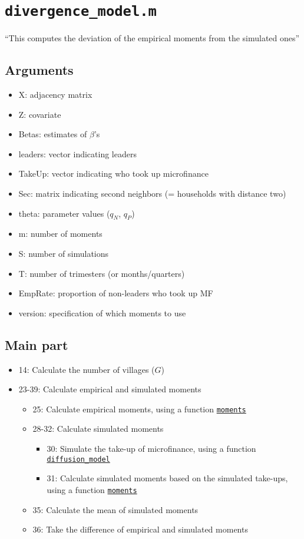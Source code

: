 \documentclass[10pt,letterpaper]{article}
\begin{document}
\section{\texttt{divergence\_model.m}}\label{divergence_model}

``This computes the deviation of the empirical moments from the simulated ones''

\subsection*{Arguments}
\begin{itemize}
  \item X: adjacency matrix
  \item Z: covariate
  \item Betas: estimates of $\beta$'s 
  \item leaders: vector indicating leaders
  \item TakeUp: vector indicating who took up microfinance
  \item Sec: matrix indicating second neighbors (= households with distance two)
  \item theta: parameter values ($q_N$, $q_P$)
  \item m: number of moments
  \item S: number of simulations
  \item T: number of trimesters (or months/quarters)
  \item EmpRate: proportion of non-leaders who took up MF
  \item version: specification of which moments to use
\end{itemize}

\subsection*{Main part}
\begin{itemize}
  \item 14: Calculate the number of villages ($G$)
  \item 23-39: Calculate empirical and simulated moments
    \begin{itemize}
      \item 25: Calculate empirical moments, using a function \hyperref[moments]{\texttt{moments}}
      \item 28-32: Calculate simulated moments
        \begin{itemize}
          \item 30: Simulate the take-up of microfinance, using a function \hyperref[diffusion_model]{\texttt{diffusion\_model}}
          \item 31: Calculate simulated moments based on the simulated take-ups, using a function \hyperref[moments]{\texttt{moments}}
        \end{itemize}
      \item 35: Calculate the mean of simulated moments
      \item 36: Take the difference of empirical and simulated moments
    \end{itemize}
\end{itemize}
\end{document}

